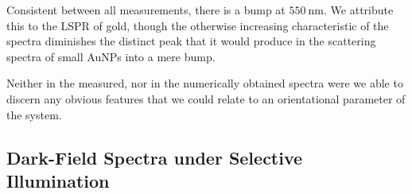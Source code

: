 \documentclass[10pt]{article}
\begin{document}




Consistent between all measurements, there is a bump at $\SI{550}{\nano\meter}$. 
We attribute this to the LSPR of gold, though the otherwise increasing characteristic of the spectra diminishes the distinct peak that it would produce in the scattering spectra of small AuNPs into a mere bump. 

Neither in the measured, nor in the numerically obtained spectra were we able to discern any obvious features that we could relate to an orientational parameter of the system. 














\subsection*{Dark-Field Spectra under Selective Illumination}
\end{document}
